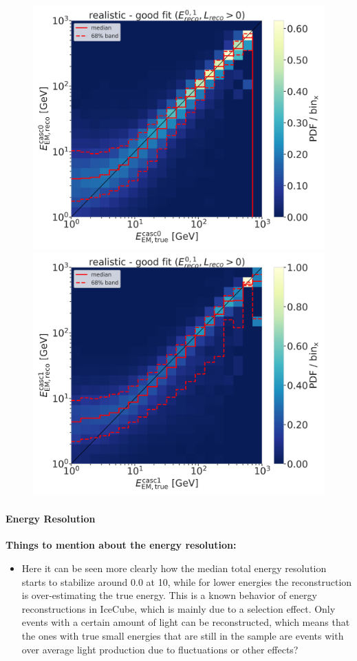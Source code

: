 \begin{figure}[h]
	\centering
    \includegraphics[width=0.49\linewidth]{figures/model_independent_simulation/results/realistic/2d_hists/194603_casc0_reco_energy_vs_casc0_true_energy_goodfit_step_contours.png}
    \includegraphics[width=0.49\linewidth]{figures/model_independent_simulation/results/realistic/2d_hists/194603_casc1_reco_energy_vs_casc1_true_energy_goodfit_step_contours.png}
    \caption[]{}
\end{figure}


\paragraph{Energy Resolution}

\textbf{Things to mention about the energy resolution:}
\begin{itemize}
    \item Here it can be seen more clearly how the median total energy resolution starts to stabilize around 0.0 at \SI{10}{\gev}, while for lower energies the reconstruction is over-estimating the true energy. This is a known behavior of energy reconstructions in IceCube, which is mainly due to a selection effect. Only events with a certain amount of light can be reconstructed, which means that the ones with true small energies that are still in the sample are events with over average light production due to fluctuations or other effects?
\end{itemize}

